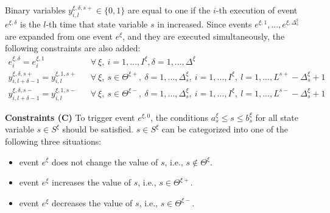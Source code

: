 \documentclass[]{interact}
\theoremstyle{plain}%
\theoremstyle{definition}
\theoremstyle{remark}
\begin{document}
Binary variables $y^{\xi,\delta,s+}_{i,l}\in \{0,1\}$ are equal to one if the $i$-th execution of event $e^{\xi,\delta}$ is the $l$-th time that state variable $s$ in increased. Since events $e^{\xi,1},...,e^{\xi,\Delta^{\xi}_s}$ are expanded from one event $e^{\xi}$, and they are executed simultaneously, the following constraints are also added:
\begin{eqnarray}
e^{\xi,\delta}_i = e^{\xi,1}_i && \forall\ \xi,\ i=1,...,I^{\xi}, \delta=1,...,\Delta^{\xi}\\
y^{\xi,\delta,s+}_{i,l+\delta-1} = y^{\xi,1,s+}_{i,l} &&\forall\ \xi,\ s\in\Theta^{\xi+},\ \delta=1,...,\Delta^{\xi}_s,\ i=1,...,I^{\xi}, \ l=1,...,L^{s+}-\Delta^{\xi}_s+1\\
y^{\xi,\delta,s-}_{i,l+\delta-1} = y^{\xi,1,s-}_{i,l} &&\forall\ \xi,\ s\in\Theta^{\xi-},\ \delta=1,...,\Delta^{\xi}_s,\ i=1,...,I^{\xi}, \ l=1,...,L^{s-}-\Delta^{\xi}_s+1
\end{eqnarray}


\textbf{Constraints (C)} To trigger event $e^{\xi,0}$, the conditions $a^{\xi}_s\le s\le b^{\xi}_s$ for all state variable $s\in S^{\xi}$ should be satisfied. $s\in S^{\xi}$ can be categorized into one of the following three situations:
\begin{itemize}
	\item event $e^{\xi}$ does not change the value of $s$, i.e., $s\notin \Theta^{\xi}$.
	\item event $e^{\xi}$ increases the value of $s$, i.e., $s\in \Theta^{\xi+}$. 
	\item event $e^{\xi}$ decreases the value of $s$, i.e., $s\in \Theta^{\xi-}$. 
\end{itemize}
\end{document}
